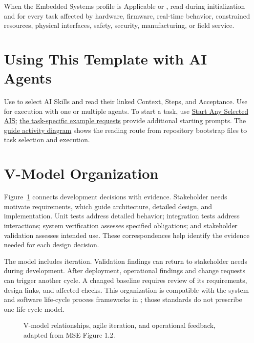 When the Embedded Systems profile is Applicable or \OwnedTBD{}, read
 during initialization and for every task
affected by hardware, firmware, real-time behavior, constrained resources,
physical interfaces, safety, security, manufacturing, or field service.

\section{Using This Template with AI Agents}
\label{Section:UsingTemplateAI}
Use  to select AI Skills and read their
linked Context, Steps, and Acceptance. Use
 for execution with one or multiple
agents. To start a task, use
\hyperref[Section:AIStartSelectedTaskPrompt]{Start Any Selected AIS};
\hyperref[Section:AIExamplePrompts]{the task-specific example requests}
provide additional starting prompts. The
\hyperref[Figure:AIGuideActivity]{guide activity diagram} shows the reading
route from repository bootstrap files to task selection and execution.

\section{V-Model Organization}
Figure~\ref{Figure:VModel} connects development decisions with evidence.
Stakeholder needs motivate requirements, which guide architecture, detailed
design, and implementation. Unit tests address detailed behavior; integration
tests address interactions; system verification assesses specified obligations;
and stakeholder validation assesses intended use. These correspondences help
identify the evidence needed for each design decision.

The model includes iteration. Validation findings can return to stakeholder
needs during development. After deployment, operational findings and change
requests can trigger another cycle. A changed baseline requires review of its
requirements, design links, and affected checks. This organization is
compatible with the system and software life-cycle process frameworks in
\cite{ISO15288,ISO12207}; those standards do not prescribe one life-cycle model.

\begin{figure}[htbp]
\centering
\resizebox{\textwidth}{!}{}
\caption{V-model relationships, agile iteration, and operational feedback, adapted from MSE Figure 1.2.}
\label{Figure:VModel}
\end{figure}
